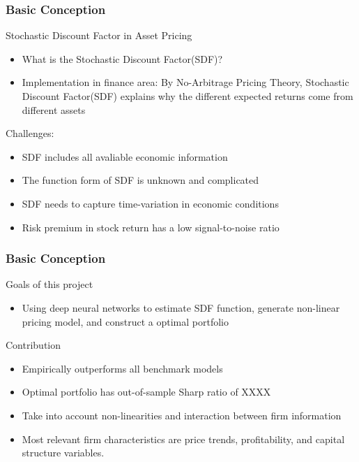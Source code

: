 \documentclass{beamer}
\begin{document}
\begin{frame}
\frametitle{Basic Conception}
\begin{block}{Stochastic Discount Factor in Asset Pricing}
\begin{itemize}
\item What is the Stochastic Discount Factor(SDF)?
\item Implementation in finance area: By No-Arbitrage Pricing Theory, Stochastic Discount Factor(SDF) explains why the different expected returns come from different assets
\end{itemize}
\end{block}

\begin{block}{Challenges:}
\begin{itemize}
\item SDF includes all avaliable economic information
\item The function form of SDF is unknown and complicated
\item SDF needs to capture time-variation in economic conditions
\item Risk premium in stock return has a low signal-to-noise ratio
\end{itemize}
\end{block}
\end{frame}


\begin{frame}
\frametitle{Basic Conception}
\begin{block}{Goals of this project}
\begin{itemize}
\item Using deep neural networks to estimate SDF function, generate non-linear pricing model, and construct a optimal portfolio
\end{itemize}
\end{block}
\begin{block}{Contribution}
\begin{itemize}
\item Empirically outperforms all benchmark models
\item Optimal portfolio has out-of-sample Sharp ratio of XXXX
\item Take into account non-linearities and interaction between firm information
\item Most relevant firm characteristics are price trends, profitability, and capital structure variables.
\end{itemize}
\end{block}
\end{frame}
\end{document}
